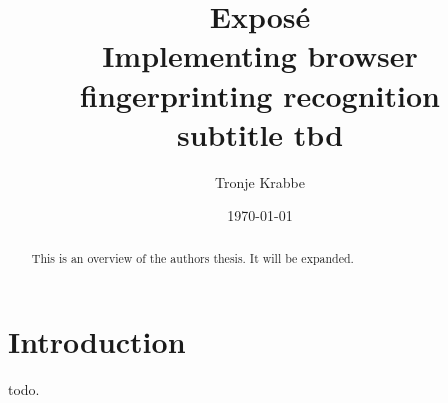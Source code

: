 \documentclass[a4paper, 12pt]{scrreprt}
\title{
	Exposé\\
	\medskip
	\large Implementing browser fingerprinting recognition \\
    subtitle tbd
}
\author{Tronje Krabbe}
\date{\today}
\begin{document}
\maketitle

\begin{abstract}
	\doublespacing
	This is an overview of the authors thesis.
    It will be expanded.
\end{abstract}

\tableofcontents

\chapter{Introduction}
    todo.
\end{document}
